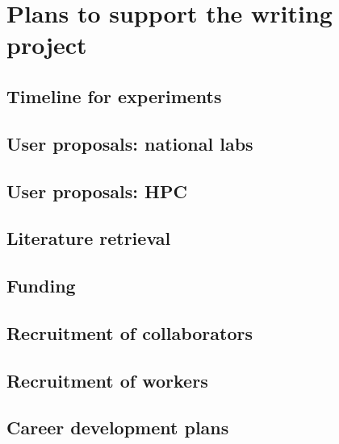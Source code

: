 \documentclass[11pt,letterpaper]{article}
\begin{document}
\section{Plans to support the writing project}
\label{sec:orgea63d3e}
\subsection{Timeline for experiments}
\label{sec:orgcadfce6}


\subsection{User proposals: national labs}
\label{sec:org1c3c27b}


\subsection{User proposals: HPC}
\label{sec:org5f34f12}



\subsection{Literature retrieval}
\label{sec:org33ac870}




\subsection{Funding}
\label{sec:orgfacb6dc}



\subsection{Recruitment of collaborators}
\label{sec:orgf8fb113}



\subsection{Recruitment of workers}
\label{sec:org2c359c8}



\subsection{Career development plans}
\label{sec:org6ce5116}
\end{document}
